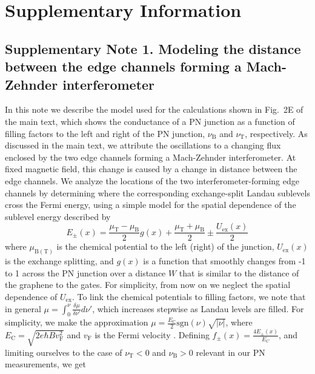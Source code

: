 \documentclass[%
reprint,amsmath,amssymb,aps,prl,superscriptaddress,
twocolumn
]{revtex4-1}
\begin{document}
		\section{Supplementary Information}
		
		
		\subsection{Supplementary Note 1. Modeling the distance between the edge channels forming a Mach-Zehnder interferometer}
		
		In this note we describe the model used for the calculations shown in Fig.~2E of the main text, which shows the conductance of a PN junction as a function of filling factors to the left and right of the PN junction, $\nu_\mathrm{B}$ and $\nu_\mathrm{T}$, respectively.  As discussed in the main text, we attribute the oscillations to a changing flux enclosed by the two edge channels forming a Mach-Zehnder interferometer. At fixed magnetic field, this change is caused by a change in distance between the edge channels. We analyze the locations of the two interferometer-forming edge channels by determining where the corresponding exchange-split Landau sublevels cross the Fermi energy, using a simple model for the spatial dependence of the sublevel energy described by
		\begin{equation}
		E_\pm(x)=\frac{\mu_\mathrm{T}-\mu_\mathrm{B}}{2} g(x) + \frac{\mu_\mathrm{T}+\mu_\mathrm{B}}{2}\pm \frac{U_\mathrm{ex}(x)}{2}
		\end{equation}
		where $\mu_{\mathrm{B(T)}}$ is the chemical potential to the left (right) of the junction, $U_\mathrm{ex}(x)$ is the exchange splitting, and $g(x)$ is a function that smoothly changes from -1 to 1 across the PN junction over a distance $W$ that is similar to the distance of the graphene to the gates. For simplicity, from now on we neglect the spatial dependence of $U_{\mathrm{ex}}$. To link the chemical potentials to filling factors, we note that in general $\mu = \int_{0}^{\nu} \frac{\delta \mu}{\delta \nu'} d \nu'$, which increases stepwise as Landau levels are filled. For simplicity, we make the approximation $\mu=\frac{E_\mathrm{C}}{2}\mathrm{sgn}(\nu)\sqrt{|\nu|}$, where $E_\mathrm{C} = \sqrt{2e\hbar B v_\mathrm{F}^2}$ and $v_\mathrm{F}$ is the Fermi velocity \cite{Zhang2005}. Defining $f_\pm(x)=\frac{4E_\pm(x)}{E_C}$, and limiting ourselves to the case of $\nu_\mathrm{T} < 0$ and $\nu_\mathrm{B} >0$ relevant in our PN measurements, we get 
\end{document}
